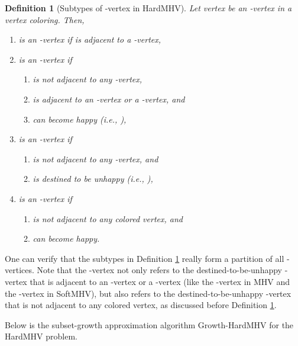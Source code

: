 \documentclass[11pt]{article}
\newtheorem{definition}{Definition}[section]
\begin{document}
\begin{definition}[Subtypes of -vertex in HardMHV]
\label{def - subtypes of L-vertex - HardMHV}
Let vertex  be an -vertex in a vertex coloring. Then,
\begin{enumerate}
\item  is an -vertex if  is adjacent to a -vertex,

\item  is an -vertex if
\begin{enumerate}
\item  is not adjacent to any -vertex,
\item  is adjacent to an -vertex or a -vertex, and
\item  can become happy (i.e.,
),
\end{enumerate}

\item  is an -vertex if
\begin{enumerate}
\item  is not adjacent to any -vertex, and
\item  is destined to be unhappy (i.e.,
),
\end{enumerate}

\item  is an -vertex if
\begin{enumerate}
\item  is not adjacent to any colored vertex, and
\item  can become happy.
\end{enumerate}
\end{enumerate}
\end{definition}

One can verify that the subtypes in
Definition \ref{def - subtypes of L-vertex - HardMHV}
really form a partition of all -vertices. Note that the -vertex
not only refers to the destined-to-be-unhappy -vertex that is adjacent
to an -vertex or a -vertex (like the -vertex in MHV and
the -vertex in SoftMHV), but also refers to the
destined-to-be-unhappy -vertex that is not adjacent to any colored vertex,
as discussed before Definition \ref{def - subtypes of L-vertex - HardMHV}.


Below is the subset-growth approximation algorithm {\sc Growth-HardMHV}
for the HardMHV problem.
\end{document}
